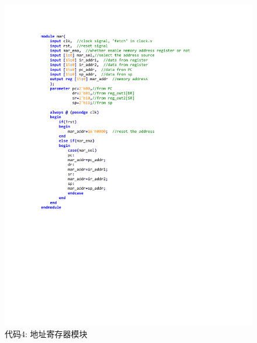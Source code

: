 \documentclass[titlepage, 11pt]{article}
\begin{document}
		\begin{figure}[H]
		\includegraphics[scale=1]{20.pdf}
		\caption*{代码4: 地址寄存器模块}
		\end{figure}
\end{document}
